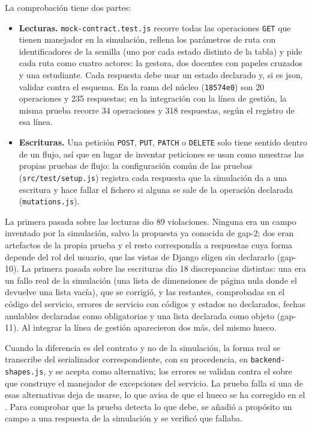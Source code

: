 La comprobación tiene dos partes:
\begin{itemize}
  \item \textbf{Lecturas.} \texttt{mock-contract.test.js} recorre todas las operaciones
        \texttt{GET} que tienen manejador en la simulación, rellena los parámetros de ruta
        con identificadores de la semilla (uno por cada estado distinto de la tabla) y pide
        cada ruta como cuatro actores: la gestora, dos docentes con papeles cruzados y una
        estudiante. Cada respuesta debe usar un estado declarado y, si es \acs{json}, validar
        contra el esquema. En la rama del núcleo (\texttt{18574e0}) son 20 operaciones y 235
        respuestas; en la integración con la línea de gestión, la misma prueba recorre 34
        operaciones y 318 respuestas, según el registro de esa línea.
  \item \textbf{Escrituras.} Una petición \texttt{POST}, \texttt{PUT}, \texttt{PATCH} o
        \texttt{DELETE} solo tiene sentido dentro de un flujo, así que en lugar de inventar
        peticiones se usan como muestras las propias pruebas de flujo: la configuración común
        de las pruebas (\texttt{src/test/setup.js}) registra cada respuesta que la simulación
        da a una escritura y hace fallar el fichero si alguna se sale de la operación
        declarada (\texttt{mutations.js}).
\end{itemize}

La primera pasada sobre las lecturas dio 89 violaciones. Ninguna era un campo inventado por la
simulación, salvo la propuesta ya conocida de gap-2; dos eran artefactos de la propia prueba y
el resto correspondía a respuestas cuya forma depende del rol del usuario, que las vistas de
Django eligen sin declararlo (gap-10). La primera pasada sobre las escrituras dio 18
discrepancias distintas: una era un fallo real de la simulación (una lista de dimensiones de
página nula donde el  devuelve una lista vacía), que se corrigió, y las
restantes, comprobadas en el código del servicio, errores de servicio con códigos y estados no
declarados, fechas anulables declaradas como obligatorias y una lista declarada como objeto
(gap-11). Al integrar la línea de gestión aparecieron dos más, del mismo hueco.

Cuando la diferencia es del contrato y no de la simulación, la forma real se transcribe del
serializador correspondiente, con su procedencia, en \texttt{backend-shapes.js}, y se acepta
como alternativa; los errores se validan contra el sobre que construye el manejador de
excepciones del servicio. La prueba falla si una de esas alternativas deja de usarse, lo que
avisa de que el hueco se ha corregido en el . Para comprobar que la prueba
detecta lo que debe, se añadió a propósito un campo a una respuesta de la simulación y se
verificó que fallaba.

